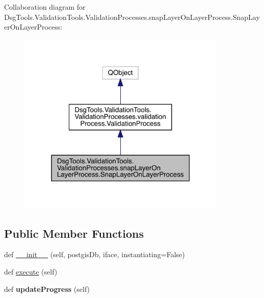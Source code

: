 Collaboration diagram for Dsg\+Tools.\+Validation\+Tools.\+Validation\+Processes.\+snap\+Layer\+On\+Layer\+Process.\+Snap\+Layer\+On\+Layer\+Process\+:
\nopagebreak
\begin{figure}[H]
\begin{center}
\leavevmode
\includegraphics[width=283pt]{class_dsg_tools_1_1_validation_tools_1_1_validation_processes_1_1snap_layer_on_layer_process_1_16ea6bda559de6e99f1894795d834d946}
\end{center}
\end{figure}
\subsection*{Public Member Functions}
\begin{DoxyCompactItemize}
\item 
def \mbox{\hyperlink{class_dsg_tools_1_1_validation_tools_1_1_validation_processes_1_1snap_layer_on_layer_process_1_1_snap_layer_on_layer_process_aa3d4a18fd48b1bcbacfda9274023932b}{\+\_\+\+\_\+init\+\_\+\+\_\+}} (self, postgis\+Db, iface, instantiating=False)
\item 
def \mbox{\hyperlink{class_dsg_tools_1_1_validation_tools_1_1_validation_processes_1_1snap_layer_on_layer_process_1_1_snap_layer_on_layer_process_a8a70ec076ee34807daa0aadfc6340d92}{execute}} (self)
\item 
\mbox{\label{class_dsg_tools_1_1_validation_tools_1_1_validation_processes_1_1snap_layer_on_layer_process_1_1_snap_layer_on_layer_process_ae40dc15e003c7785779907214d5b2f54}} 
def {\bfseries update\+Progress} (self)
\end{DoxyCompactItemize}
